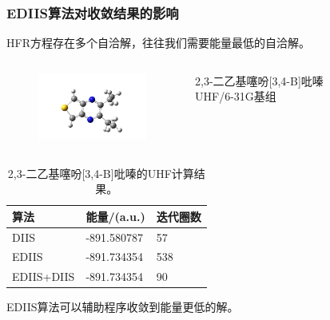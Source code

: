 \documentclass[10pt,aspectratio=43,mathserif,UTF8]{beamer}
\begin{document}
\begin{frame}
	\frametitle{EDIIS算法对收敛结果的影响}
	HFR方程存在多个自洽解，往往我们需要能量最低的自洽解。\\
	
	\begin{columns}[c]
		\begin{figure}[htbp]
			\centering
			\includegraphics[height=2.2cm]{figure/AA4/AA42.jpg}
		\end{figure}

		2,3-二乙基噻吩[3,4-B]吡嗪\\
		UHF/6-31G基组
	\end{columns}

	\begin{table}[htbp]
		\caption{2,3-二乙基噻吩[3,4-B]吡嗪的UHF计算结果。}\label{table:AA4}
		\setlength{\belowcaptionskip}{7pt}
		\centering
		\begin{tabular}{l l l}
			\toprule
			\textbf{算法}		&\textbf{能量/(a.u.)}	&\textbf{迭代圈数}\\
			\midrule
			DIIS				& -891.580787		&57\\
			EDIIS				& -891.734354		&538\\
			EDIIS+DIIS			& -891.734354		&90\\
			\bottomrule
		\end{tabular}
		\vspace{0.2cm}
	\end{table}
	\centerline{EDIIS算法可以辅助程序收敛到能量更低的解。}
\end{frame}
\end{document}
